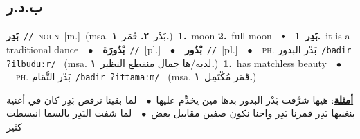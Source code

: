 \documentclass[10pt,a4paper,twoside]{article} %
\begin{document}
\begin{multicols}{2}
\vspace{-3mm}
\subsection*{\color{blue}\foreignlanguage{arabic}{ب.د.ر}\color{blue}{}} 

{\setlength\topsep{0pt}\textbf{\foreignlanguage{arabic}{بَدِر}}\ {\color{gray}\texttt{//}\color{black}}\ \textsc{noun}\ [m.]\ \color{gray}(msa. \foreignlanguage{arabic}{بَدْر}~\foreignlanguage{arabic}{\textbf{٢.}}  \foreignlanguage{arabic}{قَمَر}~\foreignlanguage{arabic}{\textbf{١.}})\color{black}\ \textbf{1.}~moon  \textbf{2.}~full moon\ \ $\smblkdiamond$\ \ \setlength\topsep{0pt}\textbf{\foreignlanguage{arabic}{بَدِر}}\ \textbf{1.}~it is a traditional dance\ \ $\bullet$\ \ \setlength\topsep{0pt}\textbf{\foreignlanguage{arabic}{بْدُورَة}}\ {\color{gray}\texttt{//}\color{black}}\ [pl.]\ \ $\bullet$\ \ \setlength\topsep{0pt}\textbf{\foreignlanguage{arabic}{بْدُور}}\ {\color{gray}\texttt{//}\color{black}}\ [pl.]\ \ $\bullet$\ \ \textsc{ph.} \color{gray} \foreignlanguage{arabic}{بَدْر البدور}\color{black}\ {\color{gray}\texttt{/{\sffamily badir ʔilbuduːr}/}\color{black}}\ \color{gray} (msa. \foreignlanguage{arabic}{لديه/ها جمال منقطع النظير}~\foreignlanguage{arabic}{\textbf{١.}})\color{black}\ \textbf{1.}~has matchless beauty\ \ $\bullet$\ \ \textsc{ph.} \color{gray} \foreignlanguage{arabic}{بَدْر التَّمَام}\color{black}\ {\color{gray}\texttt{/{\sffamily badir ʔittamaːm}/}\color{black}}\ \color{gray} (msa. \foreignlanguage{arabic}{قَمَر مُكْتَمِل}~\foreignlanguage{arabic}{\textbf{١.}})\color{black}\  \begin{flushright}\color{gray}\foreignlanguage{arabic}{\textbf{\underline{\foreignlanguage{arabic}{أمثلة}}}: هيها شرَّفت بَدْر البدور بدها مين يخدِّم عليها\ $\bullet$\ \  لما بقينا نرقص بَدِر كان في أغنية بنغنيها بَدِر قمرنا بَدِر واحنا نكون صفين مقابيل بعض\ $\bullet$\ \  لما شفت البَدِر بالسما انبسطت كثير}\end{flushright}\color{black}} \vspace{2mm}


\end{multicols}
\end{document}
